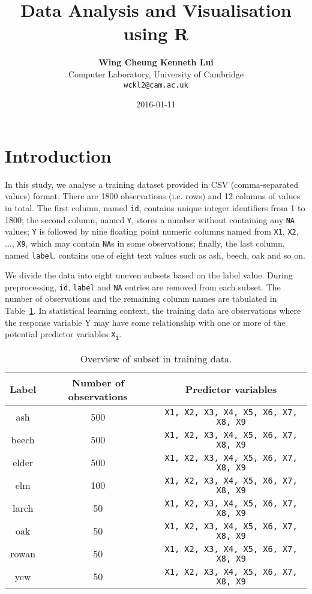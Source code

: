 \documentclass{article}
\title{Data Analysis and Visualisation using R}
\date{2016-01-11}
\author{\textbf{Wing Cheung Kenneth Lui} \\
Computer Laboratory, University of Cambridge \\
{\tt wckl2@cam.ac.uk}}
\begin{document}
  \maketitle

\section{Introduction}

In this study, we analyse a training dataset provided in CSV (comma-separated values) format. There are 1800 observations (i.e. rows) and 12 columns of values in total. The first column, named {\tt id}, contains unique integer identifiers from 1 to 1800; the second column, named {\tt Y}, stores a number without containing any {\tt NA} values; {\tt Y} is followed by nine floating point numeric columns named from {\tt X1}, {\tt X2},  \(...\), {\tt X9}, which may contain {\tt NA}s in some observations; finally, the last column, named {\tt label}, contains one of eight text values such as ash, beech, oak and so on.

We divide the data into eight uneven subsets based on the label value. During preprocessing, {\tt id}, {\tt label} and {\tt NA} entries are removed from each subset. The number of observations and the remaining column names are tabulated in Table~\ref{subset-table}. In statistical learning context, the training data are observations where the response variable Y may have some relationship with one or more of the potential predictor variables {\tt X\textsubscript{i}}.

\begin{table}
\begin{center}
\begin{tabular}{|c|c|c|}
\hline \bf Label & \bf Number of observations & \bf Predictor variables \\ \hline
ash & 500 & {\tt X1, X2, X3, X4, X5, X6, X7, X8, X9} \\ \hline
beech & 500 & {\tt X1, X2, X3, X4, X5, X6, X7, X8, X9} \\ \hline
elder & 500 & {\tt X1, X2, X3, X4, X5, X6, X7, X8, X9} \\ \hline
elm & 100 & {\tt X1, X2, X3, X4, X5, X6, X7, X8, X9} \\ \hline
larch & 50 & {\tt X1, X2, X3, X4, X5, X6, X7, X8, X9} \\ \hline
oak & 50 & {\tt X1, X2, X3, X4, X5, X6, X7, X8, X9} \\ \hline
rowan & 50 & {\tt X1, X2, X3, X4, X5, X6, X7, X8, X9} \\ \hline
yew & 50 & {\tt X1, X2, X3, X4, X5, X6, X7, X8, X9} \\ \hline
\end{tabular}
\end{center}
\caption{\label{subset-table} Overview of subset in training data.}
\end{table}
\end{document}
